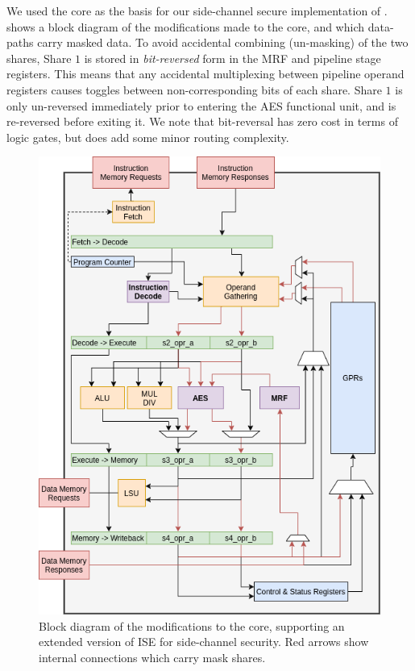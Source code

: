 We used the  core as the basis for our side-channel secure
implementation of .
 shows a block diagram of the modifications
made to the core, and which data-paths carry masked data.
To avoid accidental combining (un-masking) of the two shares,
Share $1$ is stored in {\em bit-reversed} form in the MRF and pipeline
stage registers.
This means that any accidental multiplexing between pipeline operand
registers causes toggles between non-corresponding bits of each share.
Share $1$ is only un-reversed immediately prior to entering the
AES functional unit, and is re-reversed before exiting it.
We note that bit-reversal has zero cost in terms of logic gates, but
does add some minor routing complexity.


\begin{figure}
\centering
\includegraphics[scale=0.45,angle=90]{diagrams/scarv-cpu-uarch-sca.png}
\caption{Block diagram of the modifications to the  core,
supporting an extended version of ISE  for side-channel
security.
Red arrows show internal connections which carry mask shares.}
\label{fig:sca:uarch}
\end{figure}


